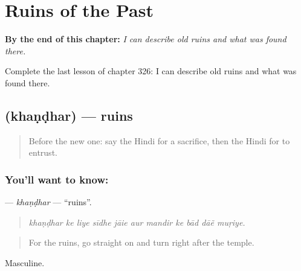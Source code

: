 
\chapter{Ruins of the Past}
\label{ch:hi-ruins-of-the-past}

\begin{chapteropening}
\textbf{By the end of this chapter:} \emph{I can describe old ruins and what was found there.}

Complete the last lesson of chapter 326: I can describe old ruins and what was found there.
\end{chapteropening}

\section[\texorpdfstring{\hi{खंडहर} (khaṇḍhar)}{खंडहर (khaṇḍhar)}]{ (khaṇḍhar) — ruins}

\label{lesson:HI-C326-khandhar}



\begin{quote}
Before the new one: say the Hindi for a sacrifice, then the Hindi for to entrust.
\end{quote}

\subsection*{You'll want to know: }
\textbf{} — \emph{khaṇḍhar} — \textquotedblleft{}ruins\textquotedblright{}.

\begin{quote}
          
\end{quote}

\begin{quote}
\emph{khaṇḍhar ke liye sīdhe jāie aur mandir ke bād dāẽ muṛiye.}
\end{quote}

\begin{quote}
For the ruins, go straight on and turn right after the temple.
\end{quote}

Masculine.

